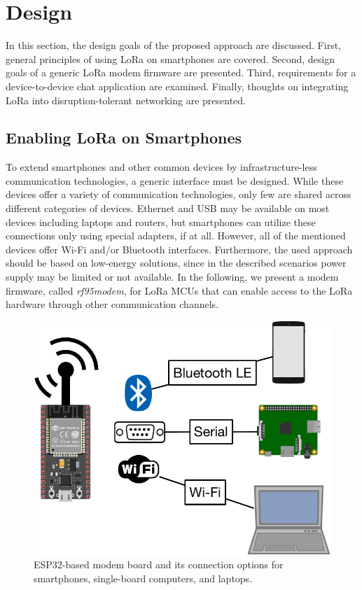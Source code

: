 \section{Design}
\label{hoechst2020lora:sec:design}

In this section, the design goals of the proposed approach are discussed.
First, general principles of using LoRa on smartphones are covered.
Second, design goals of a generic LoRa modem firmware are presented.
Third, requirements for a device-to-device chat application are examined.
Finally, thoughts on integrating LoRa into disruption-tolerant networking are presented.

\subsection{Enabling LoRa on Smartphones}
To extend smartphones and other common devices by infrastructure-less communication technologies, a generic interface must be designed.
While these devices offer a variety of communication technologies, only few are shared across different categories of devices.
Ethernet and USB may be available on most devices including laptops and routers, but smartphones can utilize these connections only using special adapters, if at all. 
However, all of the mentioned devices offer Wi-Fi and/or Bluetooth interfaces.
Furthermore, the used approach should be based on low-energy solutions, since in the described scenarios power supply may be limited or not available.
In the following, we present a modem firmware, called \textit{rf95modem},  for LoRa MCUs that can enable access to the LoRa hardware through other communication channels.

\begin{figure}[ht!]
    \centering
    \includegraphics[width=.6\columnwidth]{gfx/rf95modem-connections.pdf}
    \caption{ESP32-based modem board and its connection options for smartphones, single-board computers, and laptops.}
    \label{hoechst2020lora:fig:rf95modem}
\end{figure}

